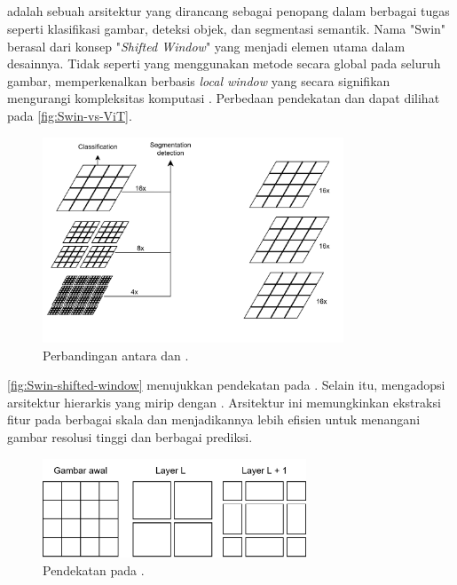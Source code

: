 \subsection{\swin}
\label{subsec:swin}

\swin{} adalah sebuah arsitektur \vitfull{} yang dirancang sebagai penopang dalam berbagai tugas \cv{} seperti klasifikasi gambar, deteksi objek, dan segmentasi semantik. Nama "Swin" berasal dari konsep
"\emph{Shifted Window}" yang menjadi elemen utama dalam desainnya. Tidak seperti \vit{} yang menggunakan metode \selfattention{} secara global
pada seluruh gambar, \swin{} memperkenalkan \selfattention{} berbasis \emph{local window} yang secara signifikan mengurangi kompleksitas komputasi \parencite{liu2021swin}. Perbedaan pendekatan \swin{} dan \vit{} dapat dilihat pada \autoref{fig:Swin-vs-ViT}. 

\begin{figure}[htbp]
    \centering
    \includegraphics[width=0.8\textwidth]{images/swin-vit.png}
    \caption{Perbandingan antara \swin{} dan \vitfull{} \parencite{liu2021swin}.}
    \label{fig:Swin-vs-ViT}
\end{figure}


\autoref{fig:Swin-shifted-window} menujukkan pendekatan \shiftedwindow{} pada \swin. Selain itu, \swin{} mengadopsi arsitektur hierarkis yang mirip dengan \cnn. Arsitektur ini memungkinkan ekstraksi fitur pada berbagai skala dan menjadikannya lebih efisien untuk menangani gambar resolusi tinggi dan berbagai prediksi.

\begin{figure}[htbp]
    \centering
    \includegraphics[width=0.7\textwidth]{images/swin-shifted-window.png}
    \caption{Pendekatan \shiftedwindow{} pada \swin{} \parencite{liu2021swin}.}
    \label{fig:Swin-shifted-window}
\end{figure}

